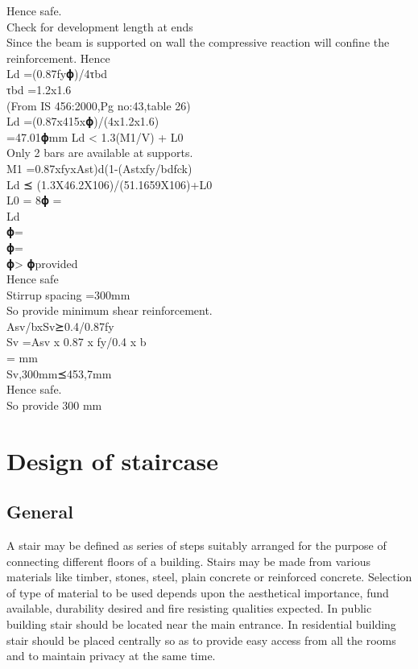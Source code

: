 Hence safe.\\
Check for development length at ends\\
Since the beam is supported on wall the compressive reaction will confine the reinforcement. Hence\\
Ld                                                               =(0.87fy𝛟)/4τbd\\
τbd                                                             =1.2x1.6\\
(From IS 456:2000,Pg no:43,table 26)\\
Ld                                                 =(0.87x415x𝛟)/(4x1.2x1.6)\\
=47.01𝛟mm
Ld < 1.3(M1/V) + L0\\
Only 2 bars are available at supports.\\ 
M1                       =0.87xfyxAst)d(1-(Astxfy/bdfck)\\

Ld ⪯ (1.3X46.2X106)/(51.1659X106)+L0\\
L0 = 8𝛟 = \\
Ld\\
𝛟=\\
𝛟=\\
𝛟> 𝛟provided\\
Hence safe\\

Stirrup spacing                                  =300mm\\
So provide minimum shear reinforcement.\\
Asv/bxSv⪰0.4/0.87fy\\
Sv						 =Asv x 0.87 x fy/0.4 x b\\
= mm\\
Sv,300mm⪯453,7mm\\
Hence safe.\\
So provide 300 mm\\


\section{Design of staircase}
\subsection{General}
A stair may be defined as series of steps suitably arranged for the purpose of connecting different floors of a building. Stairs may be made from various materials like timber, stones, steel, plain concrete or reinforced concrete. Selection of type of material to be used depends upon the aesthetical importance, fund available, durability desired and fire resisting qualities expected. In public building stair should be located near the main entrance. In residential building stair should be placed centrally so as to provide easy access from all the rooms and to maintain privacy at the same time.
